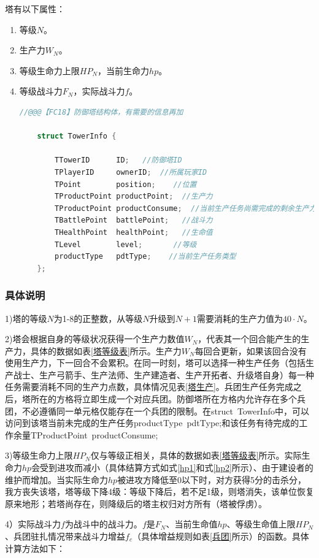 \documentclass[a4paper,4pt]{article}
\begin{document}
塔有以下属性：
\begin{enumerate}[fullwidth, itemindent=2em, label=(\arabic*)]
  \item 等级$N$。
  \item 生产力$W_N$。
  \item 等级生命力上限$HP_N$，当前生命力$hp$。
  \item 等级战斗力$F_N$，实际战斗力$f$。%
        \begin{lstlisting}[language={C++},title={防御塔结构体}]  %插入代码块
  	//@@@【FC18】防御塔结构体，有需要的信息再加
  	
  	struct TowerInfo {
  		
  		TTowerID      ID;   //防御塔ID
  		TPlayerID     ownerID;  //所属玩家ID
  		TPoint        position;    //位置
  		TProductPoint productPoint;  //生产力
  		TProductPoint productConsume;  //当前生产任务尚需完成的剩余生产力值
  		TBattlePoint  battlePoint;   //战斗力
  		THealthPoint  healthPoint;   //生命值
  		TLevel        level;       //等级
  		productType   pdtType;    //当前生产任务类型
  	};
  \end{lstlisting}

\end{enumerate}
\subsubsection{具体说明}
1)塔的等级$N$为1-8的正整数，从等级$N$升级到$N+1$需要消耗的生产力值为$40 \cdot N$。\par
2)塔会根据自身的等级状况获得一个生产力数值$W_N$，代表其一个回合能产生的生产力，具体的数据如表\ref{塔等级表}所示。生产力$W_N$每回合更新，如果该回合没有使用生产力，下一回合不会累积。在同一时刻，塔可以选择一种生产任务（包括生产战士、生产弓箭手、生产法师、生产建造者、生产开拓者、升级塔自身）每一种任务需要消耗不同的生产力点数，具体情况见表\ref{塔生产}。兵团生产任务完成之后，塔所在的方格将立即生成一个对应兵团。防御塔所在方格内允许存在多个兵团，不必遵循同一单元格仅能存在一个兵团的限制。在struct\ TowerInfo中，可以访问到该塔当前未完成的生产任务productType\ pdtType;和该任务有待完成的工作余量TProductPoint\ productConsume;\par
3)等级生命力上限$HP_N$仅与等级正相关，具体的数据如表\ref{塔等级表}所示。实际生命力$hp$会受到进攻而减小（具体结算方式如式\ref{hp1}和式\ref{hp2}所示）、由于建设者的维护而增加。当实际生命力$hp$被进攻方降低至0以下时，对方获得5分的击杀分，我方丧失该塔，塔等级下降4级：等级下降后，若不足1级，则塔消失，该单位恢复原来地形；若塔尚存在，则降级后的塔主权归对方所有（塔被俘虏）。\par
4）实际战斗力$f$为战斗中的战斗力。$f$是$F_N$、当前生命值$hp$、等级生命值上限$HP_N$、兵团驻扎情况带来战斗力增益$f_c$（具体增益规则如表\ref{兵团}所示）的函数。具体计算方法如下：
\end{document}
